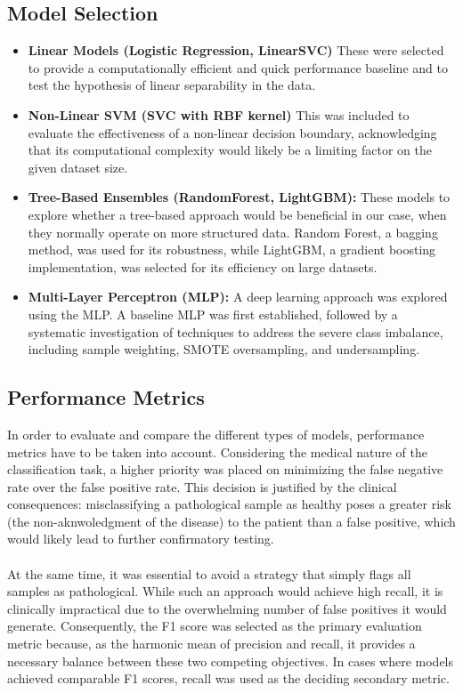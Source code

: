 \documentclass[a4paper,12pt]{article}
\begin{document}
\subsection*{Model Selection}
\begin{itemize}[leftmargin=*]
    \item \textbf{Linear Models (Logistic Regression, LinearSVC)} These were selected to provide a computationally efficient and quick performance baseline and to test the hypothesis of linear separability in the data.

    \item \textbf{Non-Linear SVM (SVC with RBF kernel)} This was included to evaluate the effectiveness of a non-linear decision boundary, acknowledging that its computational complexity would likely be a limiting factor on the given dataset size.

    \item \textbf{Tree-Based Ensembles (RandomForest, LightGBM):} These models to explore whether a tree-based approach would be beneficial in our case, when they normally operate on more structured data. Random Forest, a bagging method, was used for its robustness, while LightGBM, a gradient boosting implementation, was selected for its efficiency on large datasets.

    \item \textbf{Multi-Layer Perceptron (MLP):} A deep learning approach was explored using the MLP. A baseline MLP was first established, followed by a systematic investigation of techniques to address the severe class imbalance, including sample weighting, SMOTE oversampling, and undersampling.
\end{itemize}

\subsection*{Performance Metrics}
In order to evaluate and compare the different types of models, performance metrics have to be taken into account. Considering the medical nature of the classification task, a higher priority was placed on minimizing the false negative rate over the false positive rate. This decision is justified by the clinical consequences: misclassifying a pathological sample as healthy poses a greater risk (the non-aknwoledgment of the disease) to the patient than a false positive, which would likely lead to further confirmatory testing. \\\\
At the same time, it was essential to avoid a strategy that simply flags all samples as pathological. While such an approach would achieve high recall, it is clinically impractical due to the overwhelming number of false positives it would generate. Consequently, the F1 score was selected as the primary evaluation metric because, as the harmonic mean of precision and recall, it provides a necessary balance between these two competing objectives. In cases where models achieved comparable F1 scores, recall was used as the deciding secondary metric.
\end{document}
